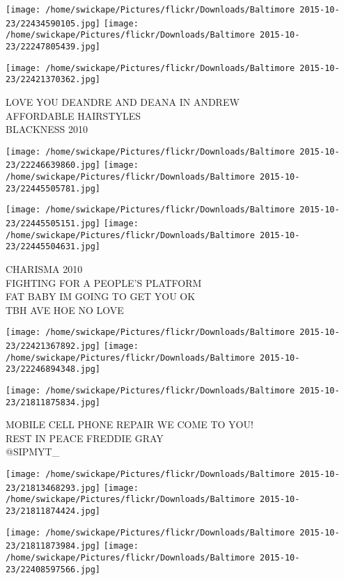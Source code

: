 \documentclass[10pt,letterpaper]{article}
\begin{document}
\texttt{[image: /home/swickape/Pictures/flickr/Downloads/Baltimore 2015-10-23/22434590105.jpg]}
\texttt{[image: /home/swickape/Pictures/flickr/Downloads/Baltimore 2015-10-23/22247805439.jpg]}

\vspace{0.25in}
\texttt{[image: /home/swickape/Pictures/flickr/Downloads/Baltimore 2015-10-23/22421370362.jpg]}

LOVE YOU DEANDRE AND DEANA IN ANDREW\\
AFFORDABLE HAIRSTYLES\\
BLACKNESS 2010\\
\pagebreak

\texttt{[image: /home/swickape/Pictures/flickr/Downloads/Baltimore 2015-10-23/22246639860.jpg]}
\texttt{[image: /home/swickape/Pictures/flickr/Downloads/Baltimore 2015-10-23/22445505781.jpg]}

\texttt{[image: /home/swickape/Pictures/flickr/Downloads/Baltimore 2015-10-23/22445505151.jpg]}
\texttt{[image: /home/swickape/Pictures/flickr/Downloads/Baltimore 2015-10-23/22445504631.jpg]}

CHARISMA 2010\\
FIGHTING FOR A PEOPLE'S PLATFORM\\
FAT BABY IM GOING TO GET YOU OK\\
TBH AVE HOE NO LOVE\\
\pagebreak

\texttt{[image: /home/swickape/Pictures/flickr/Downloads/Baltimore 2015-10-23/22421367892.jpg]}
\texttt{[image: /home/swickape/Pictures/flickr/Downloads/Baltimore 2015-10-23/22246894348.jpg]}

\vspace{0.25in}
\texttt{[image: /home/swickape/Pictures/flickr/Downloads/Baltimore 2015-10-23/21811875834.jpg]}

MOBILE CELL PHONE REPAIR WE COME TO YOU!\\
REST IN PEACE FREDDIE GRAY\\
@SIPMYT\_\\
\pagebreak

\texttt{[image: /home/swickape/Pictures/flickr/Downloads/Baltimore 2015-10-23/21813468293.jpg]}
\texttt{[image: /home/swickape/Pictures/flickr/Downloads/Baltimore 2015-10-23/21811874424.jpg]}

\texttt{[image: /home/swickape/Pictures/flickr/Downloads/Baltimore 2015-10-23/21811873984.jpg]}
\texttt{[image: /home/swickape/Pictures/flickr/Downloads/Baltimore 2015-10-23/22408597566.jpg]}
\end{document}
